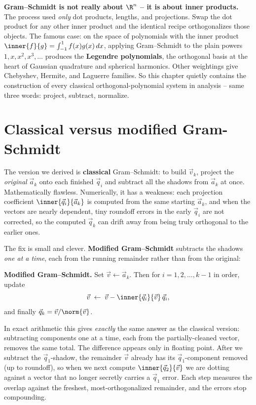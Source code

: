 \begin{connectionbox}
\textbf{Gram--Schmidt is not really about $\R^n$ -- it is about inner products.} The
process used \emph{only} dot products, lengths, and projections. Swap the dot product
for any other inner product and the identical recipe orthogonalizes those objects. The
famous case: on the space of polynomials with the inner product
$\inner{f}{g}=\int_{-1}^{1} f(x)g(x)\,dx$, applying Gram--Schmidt to the plain powers
$1,x,x^2,x^3,\dots$ produces the \textbf{Legendre polynomials}, the orthogonal basis at
the heart of Gaussian quadrature and spherical harmonics. Other weightings give
Chebyshev, Hermite, and Laguerre families. So this chapter quietly contains the
construction of every classical orthogonal-polynomial system in analysis -- same three
words: project, subtract, normalize.
\end{connectionbox}

\section{Classical versus modified Gram-Schmidt}

The version we derived is \textbf{classical} Gram--Schmidt: to build $\vec{v}_k$,
project the \emph{original} $\vec{a}_k$ onto each finished $\vec{q}_i$ and subtract all
the shadows from $\vec{a}_k$ at once. Mathematically flawless. Numerically, it has a
weakness: each projection coefficient $\inner{\vec{q}_i}{\vec{a}_k}$ is computed from
the same starting $\vec{a}_k$, and when the vectors are nearly dependent, tiny
roundoff errors in the early $\vec{q}_i$ are not corrected, so the computed $\vec{q}_k$
can drift away from being truly orthogonal to the earlier ones.

The fix is small and clever. \textbf{Modified Gram--Schmidt} subtracts the shadows
\emph{one at a time}, each from the running remainder rather than from the original:

\begin{formalbox}
\textbf{Modified Gram--Schmidt.} Set $\vec{v}\leftarrow\vec{a}_k$. Then for
$i=1,2,\dots,k-1$ in order, update
\[
  \vec{v}\;\leftarrow\;\vec{v}-\inner{\vec{q}_i}{\vec{v}}\,\vec{q}_i,
\]
and finally $\vec{q}_k=\vec{v}/\norm{\vec{v}}$.
\end{formalbox}

In exact arithmetic this gives \emph{exactly} the same answer as the classical
version: subtracting components one at a time, each from the partially-cleaned vector,
removes the same total. The difference appears only in floating point. After we
subtract the $\vec{q}_1$-shadow, the remainder $\vec{v}$ already has its
$\vec{q}_1$-component removed (up to roundoff), so when we next compute
$\inner{\vec{q}_2}{\vec{v}}$ we are dotting against a vector that no longer secretly
carries a $\vec{q}_1$ error. Each step measures the overlap against the freshest,
most-orthogonalized remainder, and the errors stop compounding.

